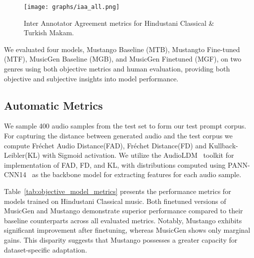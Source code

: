 
\begin{figure*}[!t]
    \centering
    \texttt{[image: graphs/iaa\_all.png]} %
    \caption{Inter Annotator Agreement metrics for Hindustani Classical \& Turkish Makam.}
    \label{iaa_evaluation}
\end{figure*}
We evaluated four models, Mustango Baseline (MTB), Mustangto Fine-tuned (MTF), MusicGen Baseline (MGB), and MusicGen Finetuned (MGF), on two genres using both objective metrics and human evaluation, providing both objective and subjective insights into model performance. 
\subsection{Automatic Metrics}
We sample 400 audio samples from the test set to form our test prompt corpus. For capturing the distance between generated audio and the test corpus we compute Fréchet Audio Distance(FAD), Fréchet Distance(FD) and Kullback-Leibler(KL) with Sigmoid activation. We utilize the AudioLDM~\cite{liu2023audioldm} toolkit for implementation of FAD, FD, and KL, with distributions computed using PANN-CNN14~\cite{Kong_Cao_Iqbal_Wang_Wang_Plumbley_2020} as the backbone model for extracting features for each audio sample. 



 Table~\ref{tab:objective_model_metrics} presents the performance metrics for models trained on Hindustani Classical music. Both finetuned versions of MusicGen and Mustango demonstrate superior performance compared to their baseline counterparts across all evaluated metrics. Notably, Mustango exhibits significant improvement after finetuning, whereas MusicGen shows only marginal gains. This disparity suggests that Mustango possesses a greater capacity for dataset-specific adaptation.

